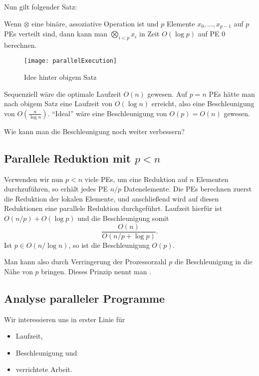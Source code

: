 Nun gilt folgender Satz:

\begin{theorem}
  Wenn \( \otimes \) eine binäre, assoziative Operation ist und \( p \) Elemente \( x_0,\dots,x_{p-1} \) auf \( p \) PEs verteilt sind, dann kann man \( \bigotimes_{i < p}x_i \) in Zeit \( O(\log p) \) auf PE \( 0 \) berechnen.
\end{theorem}

\begin{figure}[H]
  \texttt{[image: parallelExecution]}
  \caption{Idee hinter obigem Satz}
\end{figure}

Sequenziell wäre die optimale Laufzeit \( O(n) \) gewesen. Auf \( p = n \) PEs hätte man nach obigem Satz eine Laufzeit von \( O(\log n) \) erreicht, also eine Beschleunigung von \( O\left( \frac{n}{\log n} \right) \). ``Ideal'' wäre eine Beschleunigung von \( O(p) = O(n) \) gewesen.

Wie kann man die Beschleunigung noch weiter verbessern?

\subsection{Parallele Reduktion mit \( p < n \)}

Verwenden wir nun \( p < n \) viele PEs, um eine Reduktion auf \( n \) Elementen durchzuführen, so erhält jedes PE \( n/p \) Datenelemente. Die PEs berechnen zuerst die Reduktion der lokalen Elemente, und anschließend wird auf diesen Reduktionen eine parallele Reduktion durchgeführt.
Laufzeit hierfür ist \( O(n/p) + O(\log p) \) und die Beschleunigung somit
\begin{equation*}
  \frac{O(n)}{O(n/p + \log p)}\text{.}
\end{equation*}
Ist \( p \in O(n/\log n) \), so ist die Beschleunigung \( O(p) \).

Man kann also durch Verringerung der Prozessorzahl \( p \) die Beschleunigung in die Nähe von \( p \) bringen. Dieses Prinzip nennt man .

\subsection{Analyse paralleler Programme}

Wir interessieren uns in erster Linie für
\begin{itemize}
  \item Laufzeit,
  \item Beschleunigung und
  \item verrichtete Arbeit.
\end{itemize}

